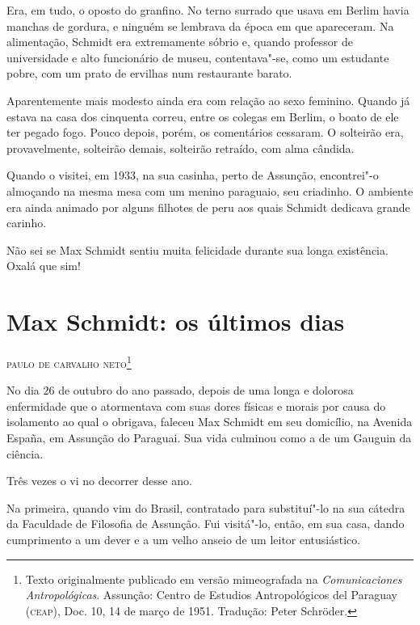 Era, em tudo, o oposto do granfino. No terno surrado que usava em Berlim
havia manchas de gordura, e ninguém se lembrava da época em que
apareceram. Na alimentação, Schmidt era extremamente sóbrio e, quando
professor de universidade e alto funcionário de museu, contentava"-se,
como um estudante pobre, com um prato de ervilhas num restaurante
barato.

Aparentemente mais modesto ainda era com relação ao sexo feminino.
Quando já estava na casa dos cinquenta correu, entre os colegas em
Berlim, o boato de ele ter pegado fogo. Pouco depois, porém, os
comentários cessaram. O solteirão era, provavelmente, solteirão demais,
solteirão retraído, com alma cândida.

Quando o visitei, em 1933, na sua casinha, perto de Assunção,
encontrei"-o almoçando na mesma mesa com um menino paraguaio, seu
criadinho. O ambiente era ainda animado por alguns filhotes de peru aos
quais Schmidt dedicava grande carinho.

Não sei se Max Schmidt sentiu muita felicidade durante sua longa
existência. Oxalá que sim!

\chapter*{Max Schmidt: os últimos dias}

\begin{flushright}
\textsc{paulo de carvalho neto}\footnote{Texto originalmente
  publicado em versão mimeografada na \textit{Comunicaciones
  Antropológicas}. Assunção: Centro de Estudios Antropológicos del
  Paraguay (\textsc{ceap}), Doc. 10, 14 de março de 1951. Tradução: Peter Schröder.}
\end{flushright}

No dia 26 de outubro do ano passado, depois de uma longa e dolorosa
enfermidade que o atormentava com suas dores físicas e morais por causa
do isolamento ao qual o obrigava, faleceu Max Schmidt em seu domicílio,
na Avenida España, em Assunção do Paraguai. Sua vida culminou como a de
um Gauguin da ciência.

Três vezes o vi no decorrer desse ano.

Na primeira, quando vim do Brasil, contratado para substituí"-lo na sua
cátedra da Faculdade de Filosofia de Assunção. Fui visitá"-lo, então, em
sua casa, dando cumprimento a um dever e a um velho anseio de um leitor
entusiástico.

